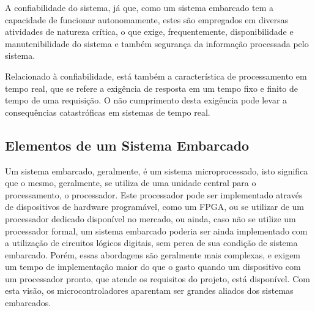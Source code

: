 A confiabilidade do sistema, já que, como um sistema embarcado tem a capacidade de funcionar autonomamente, estes são empregados em diversas atividades de natureza crítica, o que exige, frequentemente, disponibilidade e manutenibilidade do sistema e também segurança da informação processada pelo sistema. 

Relacionado à confiabilidade, está também a característica de processamento em tempo real, que se refere a exigência de resposta em um tempo fixo e finito de tempo de uma requisição. O não cumprimento desta exigência pode levar a consequências catastróficas em sistemas de tempo real. 

\subsection{\textbf{Elementos de um Sistema Embarcado}}
\label{subsec:sub01_Elementos}
Um sistema embarcado, geralmente, é um sistema microprocessado, isto significa que o mesmo, geralmente, se utiliza de uma unidade central para o processamento, o processador. Este processador pode ser implementado através de dispositivos de hardware programável, como um FPGA, ou se utilizar de um processador dedicado disponível no mercado, ou ainda, caso não se utilize um processador formal, um sistema embarcado poderia ser ainda implementado com a utilização de circuitos lógicos digitais, sem perca de sua condição de sistema embarcado. Porém, essas abordagens são geralmente mais complexas, e exigem um tempo de implementação maior do que o gasto quando um dispositivo com um processador pronto, que atende os requisitos do projeto, está disponível. Com esta visão, os microcontroladores aparentam ser grandes aliados dos sistemas embarcados.

